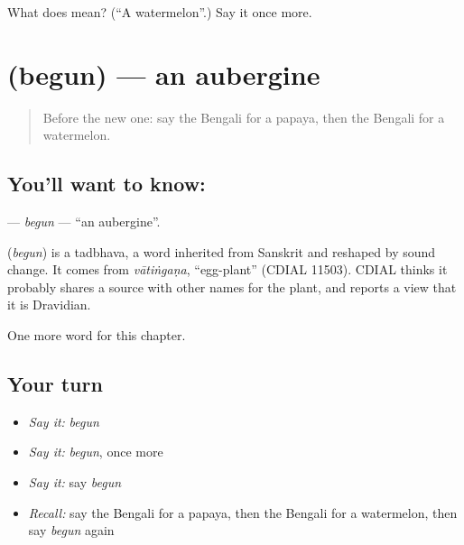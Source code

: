 \begin{tcolorbox}[breakable,colback=teal!4,colframe=teal!35!black,title={Before you move on}]
What does  mean? (\textquotedblleft{}A watermelon\textquotedblright{}.) Say it once more.
\end{tcolorbox}
\section[\texorpdfstring{\bn{বেগুন} (begun)}{বেগুন (begun)}]{ (begun) — an aubergine}

\label{lesson:BN-C116-begun}



\begin{quote}
Before the new one: say the Bengali for a papaya, then the Bengali for a watermelon.
\end{quote}

\subsection*{You'll want to know: }
\textbf{} — \emph{begun} — \textquotedblleft{}an aubergine\textquotedblright{}.

\begin{cousinweb}
\textbf{} (\emph{begun}) is a tadbhava, a word inherited from Sanskrit and reshaped by sound change. It comes from \emph{vātiṅgaṇa}, \textquotedblleft{}egg-plant\textquotedblright{} (CDIAL 11503). CDIAL thinks it probably shares a source with other names for the plant, and reports a view that it is Dravidian.
\end{cousinweb}

\begin{grammarlens}[title={What you've built}]
One more word for this chapter.
\end{grammarlens}

\subsection*{Your turn}
\begin{itemize}
\raggedright
  \item \emph{Say it:} \emph{begun}
  \item \emph{Say it:} \emph{begun}, once more
  \item \emph{Say it:} say \emph{begun}
  \item \emph{Recall:} say the Bengali for a papaya, then the Bengali for a watermelon, then say \emph{begun} again
\end{itemize}

